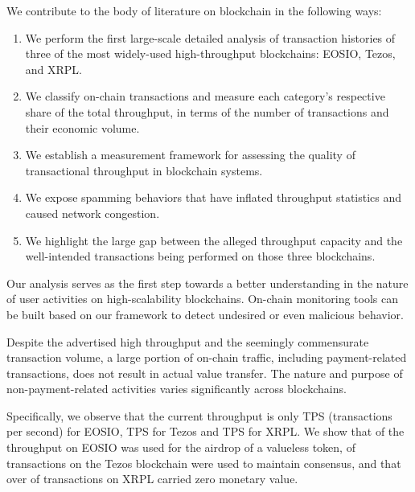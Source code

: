 We contribute to the body of literature on blockchain in the following ways:  
\begin{enumerate}%
\item We perform the first large-scale detailed analysis of transaction histories of three of the most widely-used high-throughput blockchains: EOSIO, Tezos, and XRPL.

\item We classify on-chain transactions and measure each category's respective share of the total throughput, in terms of the number of transactions and their economic volume.

\item We establish a measurement framework for assessing the quality of transactional throughput in blockchain systems.

\item We expose spamming behaviors that have inflated throughput statistics and caused network congestion.

\item We highlight the large gap between the alleged throughput capacity and the well-intended transactions being performed on those three blockchains.
\end{enumerate}
%
Our analysis serves as the first step towards a better understanding in the nature of user activities on high-scalability blockchains. On-chain monitoring tools can be built based on our framework to detect undesired or even malicious behavior.

Despite the advertised high throughput and the seemingly commensurate transaction volume, a large portion of on-chain traffic, including payment-related transactions, does not result in actual value transfer. 
The nature and purpose of non-payment-related activities varies significantly across blockchains.

Specifically, we observe that the current throughput is only TPS (transactions per second) for EOSIO,  TPS for Tezos and  TPS for XRPL.
We show that  of the throughput on EOSIO was used for the airdrop of a valueless token,  of transactions on the Tezos blockchain were used to maintain consensus,
and that over  of transactions on XRPL carried zero monetary value.


